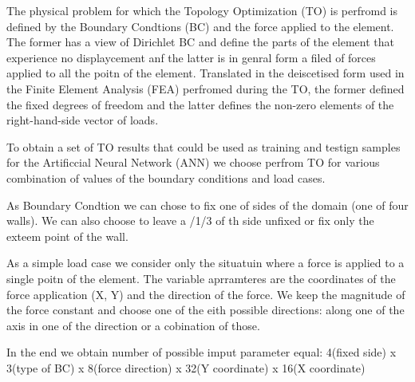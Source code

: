 
The physical problem for which the Topology Optimization (TO) is perfromd is defined by the Boundary Condtions (BC) and the force applied to the element. 
The former has a view of Dirichlet BC and define the parts of the element that experience no displaycement anf the latter is in genral form a filed of forces applied to all the poitn of the element. 
Translated in the deiscetised form used in the Finite Element Analysis (FEA) perfromed during the TO, the former defined the fixed degrees of freedom and the latter defines the non-zero elements of the right-hand-side vector of loads.

To obtain a set of TO results that could be used as training and testign samples for the Artificcial Neural Network (ANN) we choose perfrom TO for various combination of values of the boundary conditions and load cases.

As Boundary Condtion we can chose to fix one of sides of the domain (one of four walls). 
We can also choose to leave a /{1/3} of th side unfixed or fix only the exteem point of the wall.

As a simple load case we consider only the situatuin where a force is applied to a single poitn of the element. 
The variable aprramteres are the coordinates of the force application (X, Y) and the direction of the force.
We keep the magnitude of the force constant and choose one of the eith possible directions: along one of the axis in one of the direction or a cobination of those.

In the end we obtain number of possible imput parameter equal: 4(fixed side) x 3(type of BC) x 8(force direction) x 32(Y coordinate) x 16(X coordinate)


 


